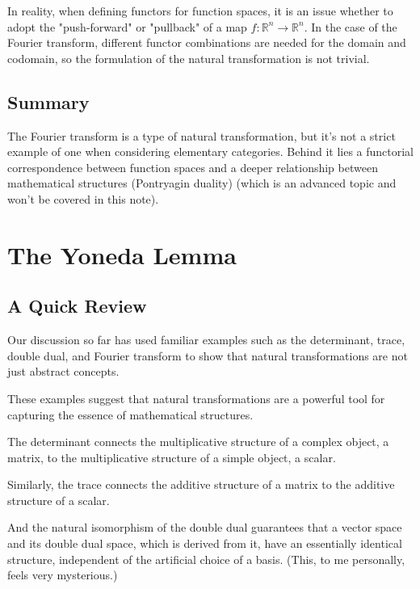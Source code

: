 \documentclass[uplatex,a4j,12pt,dvipdfmx]{jsarticle}
\begin{document}
In reality, when defining functors for function spaces, it is an issue whether to adopt the "push-forward" or "pullback" of a map $f: \mathbb{R}^n \to \mathbb{R}^n$.
In the case of the Fourier transform, different functor combinations are needed for the domain and codomain, so the formulation of the natural transformation is not trivial.

\subsection{Summary}

The Fourier transform is a type of natural transformation, but it's not a strict example of one when considering elementary categories.
Behind it lies a functorial correspondence between function spaces and a deeper relationship between mathematical structures (Pontryagin duality) (which is an advanced topic and won't be covered in this note).







\section{The Yoneda Lemma}

\subsection{A Quick Review}

Our discussion so far has used familiar examples such as the determinant, trace, double dual, and Fourier transform to show that natural transformations are not just abstract concepts.

These examples suggest that natural transformations are a powerful tool for capturing the essence of mathematical structures.

	{}

The determinant connects the multiplicative structure of a complex object, a matrix, to the multiplicative structure of a simple object, a scalar.

Similarly, the trace connects the additive structure of a matrix to the additive structure of a scalar.

And the natural isomorphism of the double dual guarantees that a vector space and its double dual space, which is derived from it, have an essentially identical structure, independent of the artificial choice of a basis.
(This, to me personally, feels very mysterious.)
\end{document}
